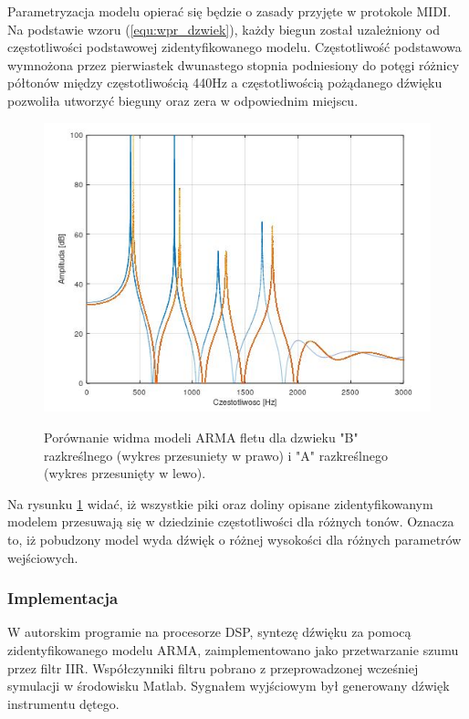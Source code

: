 Parametryzacja modelu opierać się będzie o zasady przyjęte w protokole MIDI. 
Na podstawie wzoru (\ref{equ:wpr_dzwiek}), każdy biegun został uzależniony od częstotliwości podstawowej zidentyfikowanego modelu. Częstotliwość podstawowa wymnożona przez pierwiastek dwunastego stopnia podniesiony do potęgi różnicy półtonów między częstotliwością 440Hz a częstotliwością pożądanego dźwięku pozwoliła utworzyć bieguny oraz zera w odpowiednim miejscu.
\begin{figure}[H]
	\centering
	\includegraphics[width=12cm]{grafiki/Model_B_A}
	\label{rys:por_mod_flet}
	\captionsetup{justification=centering}
	\caption{Porównanie widma modeli ARMA fletu dla dzwieku "B" razkreślnego (wykres przesuniety w prawo) i "A" razkreślnego (wykres przesunięty w lewo).}
	\label{rys:por_mod_flet}
\end{figure}
Na rysunku \ref{rys:por_mod_flet} widać, iż wszystkie piki oraz doliny opisane zidentyfikowanym modelem przesuwają się w dziedzinie częstotliwości dla różnych tonów. Oznacza to, iż pobudzony model wyda dźwięk o różnej wysokości dla różnych parametrów wejściowych.


\subsubsection{Implementacja}
W autorskim programie na procesorze DSP, syntezę dźwięku za pomocą zidentyfikowanego modelu ARMA, zaimplementowano jako przetwarzanie szumu przez filtr IIR. Współczynniki filtru pobrano z przeprowadzonej wcześniej symulacji w środowisku Matlab. Sygnałem wyjściowym był generowany dźwięk instrumentu dętego.


